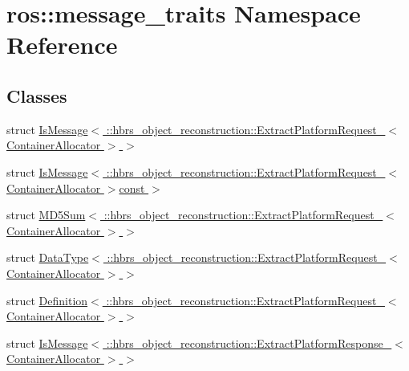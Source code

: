\hypertarget{namespaceros_1_1message__traits}{\section{ros\-:\-:message\-\_\-traits \-Namespace \-Reference}
\label{namespaceros_1_1message__traits}
}
\subsection*{\-Classes}
\begin{DoxyCompactItemize}
\item 
struct \hyperlink{structros_1_1message__traits_1_1_is_message_3_01_1_1hbrs__object__reconstruction_1_1_extract_pla7e78e3b0383459f7960736e0422fff1c}{\-Is\-Message$<$ \-::hbrs\-\_\-object\-\_\-reconstruction\-::\-Extract\-Platform\-Request\-\_\-$<$ Container\-Allocator $>$ $>$}
\item 
struct \hyperlink{structros_1_1message__traits_1_1_is_message_3_01_1_1hbrs__object__reconstruction_1_1_extract_pla39d9a6b4802de0ccc440ea4488894e66}{\-Is\-Message$<$ \-::hbrs\-\_\-object\-\_\-reconstruction\-::\-Extract\-Platform\-Request\-\_\-$<$ Container\-Allocator $>$const  $>$}
\item 
struct \hyperlink{structros_1_1message__traits_1_1_m_d5_sum_3_01_1_1hbrs__object__reconstruction_1_1_extract_platfd3ec68e33119d9e966e559be7b50877c}{\-M\-D5\-Sum$<$ \-::hbrs\-\_\-object\-\_\-reconstruction\-::\-Extract\-Platform\-Request\-\_\-$<$ Container\-Allocator $>$ $>$}
\item 
struct \hyperlink{structros_1_1message__traits_1_1_data_type_3_01_1_1hbrs__object__reconstruction_1_1_extract_platba4865a04dbdc83b21722f3becd58b36}{\-Data\-Type$<$ \-::hbrs\-\_\-object\-\_\-reconstruction\-::\-Extract\-Platform\-Request\-\_\-$<$ Container\-Allocator $>$ $>$}
\item 
struct \hyperlink{structros_1_1message__traits_1_1_definition_3_01_1_1hbrs__object__reconstruction_1_1_extract_pla0f9ad6b8395f266637e3e0e50d5139f9}{\-Definition$<$ \-::hbrs\-\_\-object\-\_\-reconstruction\-::\-Extract\-Platform\-Request\-\_\-$<$ Container\-Allocator $>$ $>$}
\item 
struct \hyperlink{structros_1_1message__traits_1_1_is_message_3_01_1_1hbrs__object__reconstruction_1_1_extract_pla3b061de190142d71a2a58e9c81ed7199}{\-Is\-Message$<$ \-::hbrs\-\_\-object\-\_\-reconstruction\-::\-Extract\-Platform\-Response\-\_\-$<$ Container\-Allocator $>$ $>$}
\item 

\end{DoxyCompactItemize}
